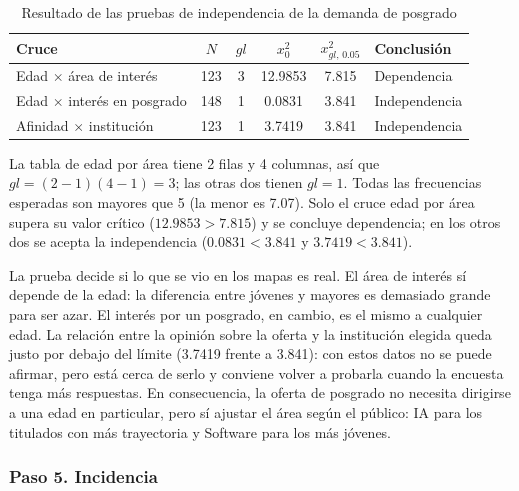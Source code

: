 \documentclass[12pt, a4paper]{article}
\newenvironment{mitabla}[2][H]{%
  \begin{table}[#1]
  \centering
  \caption{#2}
  \small
}{%
  \end{table}
}
\begin{document}
\begin{mitabla}{Resultado de las pruebas de independencia de la demanda de posgrado}\label{tab:a2-indep}
\begin{tabular}{lccccl}
\toprule
\textbf{Cruce} & \textbf{$N$} & \textbf{$gl$} & \textbf{$x_0^2$} & \textbf{$x^2_{gl,\,0.05}$} & \textbf{Conclusión} \\
\midrule
Edad $\times$ área de interés & 123 & 3 & 12.9853 & 7.815 & Dependencia \\
Edad $\times$ interés en posgrado & 148 & 1 & 0.0831 & 3.841 & Independencia \\
Afinidad $\times$ institución & 123 & 1 & 3.7419 & 3.841 & Independencia \\
\bottomrule
\end{tabular}
\end{mitabla}

La tabla de edad por área tiene 2 filas y 4 columnas, así que $gl =
(2-1)(4-1) = 3$; las otras dos tienen $gl = 1$. Todas las frecuencias
esperadas son mayores que 5 (la menor es 7.07). Solo el cruce edad por
área supera su valor crítico ($12.9853 > 7.815$) y se concluye
dependencia; en los otros dos se acepta la independencia ($0.0831 < 3.841$
y $3.7419 < 3.841$).

La prueba decide si lo que se vio en los mapas es real. El área de
interés sí depende de la edad: la diferencia entre jóvenes y mayores es
demasiado grande para ser azar. El interés por un posgrado, en cambio, es
el mismo a cualquier edad. La relación entre la opinión sobre la oferta y
la institución elegida queda justo por debajo del límite (3.7419 frente a
3.841): con estos datos no se puede afirmar, pero está cerca de serlo y
conviene volver a probarla cuando la encuesta tenga más respuestas. En
consecuencia, la oferta de posgrado no necesita dirigirse a una edad en
particular, pero sí ajustar el área según el público: IA para los
titulados con más trayectoria y Software para los más jóvenes.

\subsubsection{Paso 5. Incidencia}
\end{document}
